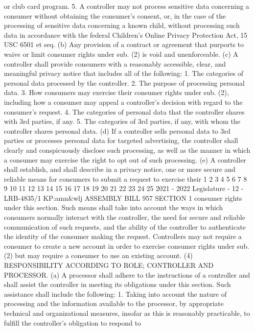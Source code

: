 or club card program.
5. A controller may not process sensitive data concerning a consumer without
obtaining the consumer's consent, or, in the case of the processing of sensitive data
concerning a known child, without processing such data in accordance with the
federal Children's Online Privacy Protection Act, 15 USC 6501 et seq.
(b) Any provision of a contract or agreement that purports to waive or limit
consumer rights under sub. (2) is void and unenforceable.
(c) A controller shall provide consumers with a reasonably accessible, clear, and
meaningful privacy notice that includes all of the following:
1. The categories of personal data processed by the controller.
2. The purpose of processing personal data.
3. How consumers may exercise their consumer rights under sub. (2), including
how a consumer may appeal a controller's decision with regard to the consumer's
request.
4. The categories of personal data that the controller shares with 3rd parties,
if any.
5. The categories of 3rd parties, if any, with whom the controller shares
personal data.
(d) If a controller sells personal data to 3rd parties or processes personal data
for targeted advertising, the controller shall clearly and conspicuously disclose such
processing, as well as the manner in which a consumer may exercise the right to opt
out of such processing.
(e) A controller shall establish, and shall describe in a privacy notice, one or
more secure and reliable means for consumers to submit a request to exercise their
1
2
3
4
5
6
7
8
9
10
11
12
13
14
15
16
17
18
19
20
21
22
23
24
25
2021 - 2022 Legislature - 12 - LRB-4835/1
KP:amn&wlj
 ASSEMBLY BILL 957 SECTION 1
consumer rights under this section. Such means shall take into account the ways in
which consumers normally interact with the controller, the need for secure and
reliable communication of such requests, and the ability of the controller to
authenticate the identity of the consumer making the request. Controllers may not
require a consumer to create a new account in order to exercise consumer rights
under sub. (2) but may require a consumer to use an existing account.
(4) RESPONSIBILITY ACCORDING TO ROLE; CONTROLLER AND PROCESSOR. (a) A
processor shall adhere to the instructions of a controller and shall assist the
controller in meeting its obligations under this section. Such assistance shall include
the following:
1. Taking into account the nature of processing and the information available
to the processor, by appropriate technical and organizational measures, insofar as
this is reasonably practicable, to fulfill the controller's obligation to respond to
